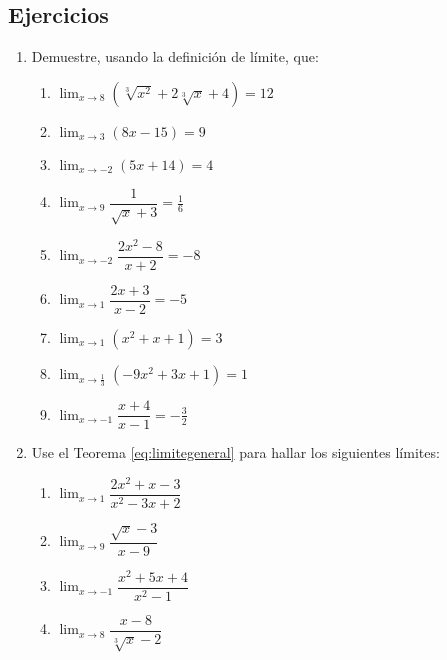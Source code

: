 \subsection{Ejercicios}
\begingroup
\small
\begin{multicols}{2}
\begin{enumerate}[leftmargin=*]
\item Demuestre, usando la definición de límite, que:
\begin{enumerate}[leftmargin=*]
\item $\displaystyle
	\lim_{x\to 8}(\sqrt[3]{x^2} + 2\sqrt[3]{x} + 4) = 12 $

\item $\displaystyle
	\lim_{x\to 3}(8x-15)=9
$
\item $\displaystyle
	\lim_{x\to -2}(5x+14)=4
$

\item $\displaystyle
	\lim_{x\to 9}\dfrac{1}{\sqrt{x} + 3} = \frac{1}{6}
$

\item $\displaystyle
	\lim_{x\to -2}\dfrac{2x^2-8}{x+2}=-8
$
\item $\displaystyle
	\lim_{x\to 1}\dfrac{2x + 3}{x - 2} = -5 $
\item $\displaystyle
	\lim_{x\to 1}(x^2+x+1)=3
$
\item $\displaystyle \lim_{x\to \frac{1}{3}}(-9x^2 + 3x + 1) = 1$

\item $\displaystyle
	\lim_{x\to -1}\dfrac{x + 4}{x - 1} = -\frac{3}{2}$
\end{enumerate}
\item Use el Teorema \ref{eq:limitegeneral} para hallar los siguientes límites:
\begin{enumerate}[leftmargin=*]
\item $\displaystyle
	\lim_{x\to 1}\dfrac{2x^2+x-3}{x^2-3x+2}$

\item $\displaystyle
	\lim_{x\to 9}\dfrac{\sqrt{x}-3}{x-9}$

\item $\displaystyle
	\lim_{x\to -1}\dfrac{x^2+5x+4}{x^2-1}$

\item $\displaystyle
	\lim_{x\to 8}\dfrac{x-8}{\sqrt[3]{x}-2}$

\end{enumerate}
\end{enumerate}
\end{multicols}
\endgroup

